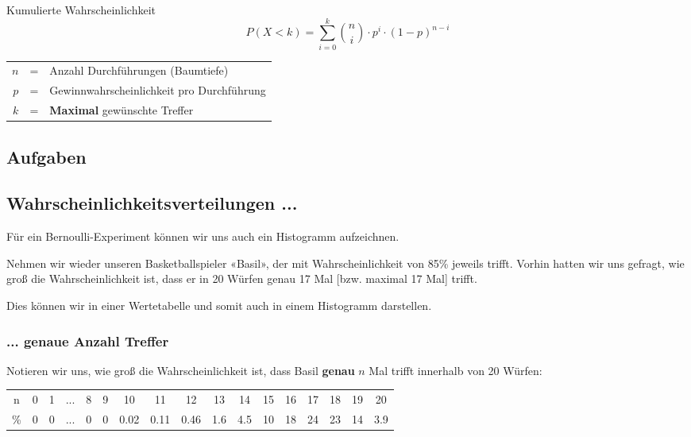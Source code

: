 \begin{gesetz}{Kumulierte Wahrscheinlichkeit}{}
  $$P(X < k) = \sum_{i=0}^k {n \choose i} \cdot{} p^i \cdot{} (1-p)^{n-i}$$


\begin{tabular}{rcl}
  $n$ &=& Anzahl Durchführungen (Baumtiefe)\\
  $p$ &=& Gewinnwahrscheinlichkeit pro Durchführung\\
  $k$ &=& \textbf{Maximal} gewünschte Treffer\\
\end{tabular}

\end{gesetz}


\subsection*{Aufgaben}

\newpage

\subsection{Wahrscheinlichkeitsverteilungen ...}

Für ein Bernoulli-Experiment können wir uns auch ein Histogramm aufzeichnen.

Nehmen wir wieder unseren Basketballspieler «Basil», der mit Wahrscheinlichkeit von 85\% jeweils trifft. Vorhin hatten wir uns gefragt, wie groß die Wahrscheinlichkeit ist, dass er in 20 Würfen genau 17 Mal [bzw. maximal 17 Mal] trifft.

Dies können wir in einer Wertetabelle und somit auch in einem Histogramm darstellen.
\newpage


\subsubsection{... genaue Anzahl Treffer}
Notieren wir uns, wie groß die Wahrscheinlichkeit ist, dass Basil \textbf{genau} $n$ Mal trifft innerhalb von 20 Würfen:

\begin{tabular}{c|cccccccccccccccc}
  n & 0 & 1 & ... & 8 & 9 & 10   & 11   & 12   & 13  & 14  & 15 & 16 & 17 & 18 & 19 &  20\\
  \%& 0 & 0 & ... & 0 & 0 & 0.02 & 0.11 & 0.46 & 1.6 & 4.5 & 10 & 18 & 24 & 23 & 14 & 3.9
\end{tabular}

